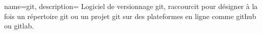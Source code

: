 

{%
    name={git},
    description={
    Logiciel de versionnage git, raccourcit pour désigner à la fois un répertoire git ou un projet git sur des plateformes en ligne comme github ou gitlab.
    }
}

